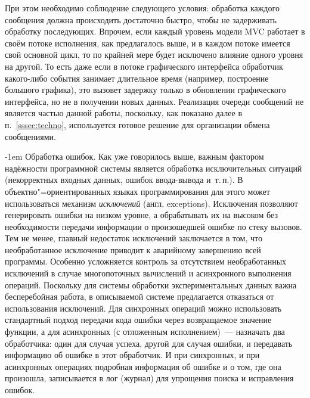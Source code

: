 \documentclass[a4paper, 14pt, titlepage]{extarticle}
\makeatletter
\newcommand{\eng}[1]{\foreignlanguage{english}{#1}}
\newcommand{\term}[1]{\emph{#1}}
\renewcommand{\paragraph}{%
    \@startsection{paragraph}{4}%
    {\parindent}{\z@}{-1em}%
    {\normalfont\normalsize\bfseries}%
  }
\makeatother
\begin{document}
  При этом необходимо соблюдение следующего условия: обработка каждого сообщения должна происходить
  достаточно быстро, чтобы не задерживать обработку
  последующих. Впрочем, если каждый уровень модели MVC работает в своём потоке исполнения, как
  предлагалось выше, и в каждом потоке имеется свой основной цикл, то по крайней мере будет
  исключено влияние одного уровня на другой. То есть даже если в потоке графического интерфейса
  обработчик какого-либо события занимает длительное время (например, построение большого графика),
  это вызовет задержку только в обновлении графического интерфейса, но не в получении новых данных.
  Реализация очереди сообщений не является частью данной работы, поскольку, как показано далее
  в п.~\ref{sssec:techno}, используется готовое решение для организации обмена сообщениями.

  \paragraph{Обработка ошибок.} Как уже говорилось выше, важным фактором надёжности программной
  системы является обработка исключительных ситуаций (некорректных входных данных, ошибок
  ввода-вывода и~т.\,п.). В объектно"=ориентированных языках программирования для этого может
  использоваться механизм \term{исключений} (англ. \eng{exceptions}).
  Исключения позволяют генерировать ошибки на низком уровне, а обрабатывать их на высоком без
  необходимости передачи информации о произошедшей ошибке по стеку вызовов.
  Тем не менее, главный недостаток исключений заключается в том, что необработанное исключение
  приводит к аварийному завершению всей программы. Особенно усложняется контроль за отсутствием
  необработанных исключений в случае многопоточных вычислений и асинхронного выполнения операций.
  Поскольку для системы обработки экспериментальных данных важна бесперебойная работа, в описываемой
  системе предлагается отказаться от использования исключений. Для синхронных операций можно
  использовать стандартный подход передачи кода ошибки через возвращаемое значение функции, а для
  асинхронных (с отложенным исполнением)~--- назначать два обработчика: один для случая успеха,
  другой для случая ошибки, и передавать информацию об ошибке в этот обработчик. И при синхронных, и
  при асинхронных операциях подробная информация об ошибке и о том, где она произошла, записывается в
  лог (журнал) для упрощения поиска и исправления ошибок.


\end{document}
